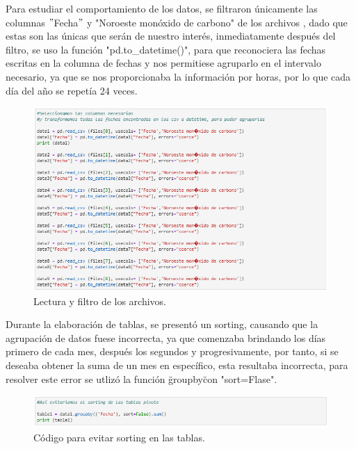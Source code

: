 \documentclass[12pt]{article}
\begin{document}
    Para estudiar el comportamiento de los datos, se filtraron únicamente las columnas $"$Fecha$"$ y "Noroeste monóxido de carbono" de los archivos , dado que estas son las únicas que serán de nuestro interés, inmediatamente después del filtro, se uso la función "pd.to\_datetime()", para que reconociera las fechas escritas en la columna de fechas y nos permitiese agruparlo en el intervalo necesario, ya que se nos proporcionaba la información por horas, por lo que cada día del año se repetía 24 veces. 
         \begin{figure}[h] 
          \centering 
            \includegraphics[width=12cm]{Pred3.png}
                \caption{Lectura y filtro de los archivos.}
                \label{fig:3}
                 \end{figure}  
    
    Durante la elaboración de tablas, se presentó un sorting, causando que la agrupación de datos fuese incorrecta, ya que comenzaba brindando los días primero de cada mes, después los segundos y progresivamente, por tanto, si se deseaba obtener la suma de un mes en específico, esta resultaba incorrecta, para resolver este error se utlizó la función \"groupby\" con "sort=Flase". 
        \begin{figure}[h!] 
          \centering 
            \includegraphics[width=12cm]{Pred4.png}
                \caption{Código para evitar sorting en las tablas.}
                \label{fig:4}
                 \end{figure} 
                 
\end{document}

